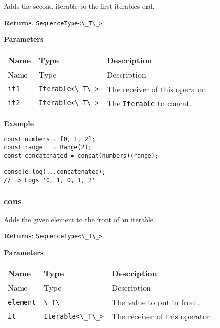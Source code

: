Adds the second iterable to the first iterables end.

\textbf{Returns}: \passthrough{\lstinline!SequenceType<\_T\_>!}

\textbf{Parameters}

\begin{longtable}[]{
  >{\raggedright\arraybackslash}p{}
  >{\raggedright\arraybackslash}p{}
  >{\raggedright\arraybackslash}p{}@{}}

\toprule\noalign{}
Name & Type & Description \\
\midrule\noalign{}
\endfirsthead
\toprule\noalign{}
Name & Type & Description \\
\midrule\noalign{}
\endhead
\bottomrule\noalign{}
\endlastfoot
\passthrough{\lstinline!it1!} &
\passthrough{\lstinline!Iterable<\_T\_>!} & The receiver of this
operator. \\
\passthrough{\lstinline!it2!} &
\passthrough{\lstinline!Iterable<\_T\_>!} & The
\passthrough{\lstinline!Iterable!} to concat. \\
\end{longtable}

\textbf{Example}

\begin{lstlisting}[label=18038071-1b77-4cab-aa88-5e597bf2423d]
const numbers = [0, 1, 2];
const range   = Range(2);
const concatenated = concat(numbers)(range);
                                            
console.log(...concatenated);
// => Logs '0, 1, 0, 1, 2'
\end{lstlisting}

\hypertarget{6a9773d8-0837-456a-bbbb-9c926d98a336}{%
\subsubsection{cons}\label{6a9773d8-0837-456a-bbbb-9c926d98a336}}

Adds the given element to the front of an iterable.

\textbf{Returns}: \passthrough{\lstinline!SequenceType<\_T\_>!}

\textbf{Parameters}

\begin{longtable}[]{
  >{\raggedright\arraybackslash}p{}
  >{\raggedright\arraybackslash}p{}
  >{\raggedright\arraybackslash}p{}@{}}

\toprule\noalign{}
Name & Type & Description \\
\midrule\noalign{}
\endfirsthead
\toprule\noalign{}
Name & Type & Description \\
\midrule\noalign{}
\endhead
\bottomrule\noalign{}
\endlastfoot
\passthrough{\lstinline!element!} & \passthrough{\lstinline!\_T\_!} &
The value to put in front. \\
\passthrough{\lstinline!it!} & \passthrough{\lstinline!Iterable<\_T\_>!}
& The receiver of this operator. \\
\end{longtable}

